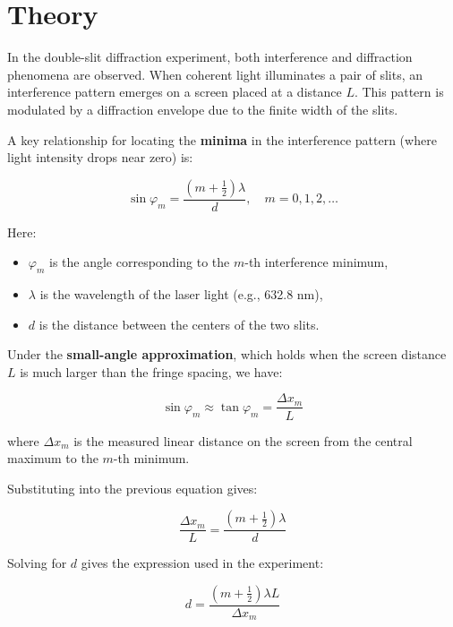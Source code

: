 \documentclass[journal]{IEEEtran}
\begin{document}
\section*{Theory}

In the double-slit diffraction experiment, both interference and diffraction phenomena are observed. When coherent light illuminates a pair of slits, an interference pattern emerges on a screen placed at a distance \( L \). This pattern is modulated by a diffraction envelope due to the finite width of the slits.

A key relationship for locating the \textbf{minima} in the interference pattern (where light intensity drops near zero) is:

\cite{lab_manual}

\begin{equation}
\sin \varphi_m = \frac{(m + \tfrac{1}{2}) \lambda}{d}, \quad m = 0, 1, 2, \ldots
\end{equation}

Here:
\begin{itemize}
    \item \( \varphi_m \) is the angle corresponding to the \( m \)-th interference minimum,
    \item \( \lambda \) is the wavelength of the laser light (e.g., 632.8 nm),
    \item \( d \) is the distance between the centers of the two slits.
\end{itemize}

Under the \textbf{small-angle approximation}, which holds when the screen distance \( L \) is much larger than the fringe spacing, we have:

\begin{equation}
\sin \varphi_m \approx \tan \varphi_m = \frac{\Delta x_m}{L}
\end{equation}

where \( \Delta x_m \) is the measured linear distance on the screen from the central maximum to the \( m \)-th minimum.

Substituting into the previous equation gives:

\begin{equation}
\frac{\Delta x_m}{L} = \frac{(m + \tfrac{1}{2}) \lambda}{d}
\end{equation}

Solving for \( d \) gives the expression used in the experiment:

\begin{equation}
d = \frac{(m + \tfrac{1}{2}) \lambda L}{\Delta x_m}
\end{equation}
\end{document}
